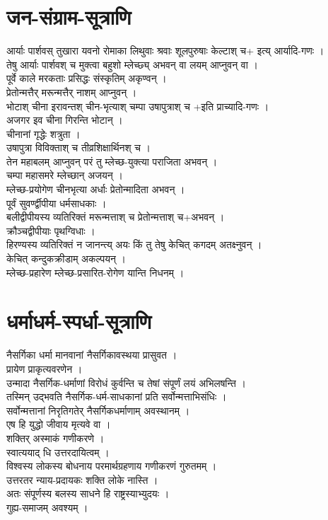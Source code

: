 \documentclass[12pt]{article}
\begin{document}
\section {{\skt जन-संग्राम-सूत्राणि
}}
{\skt आर्याः पार्शवस् तुखारा यवनो रोमाका लिथुवाः श्रवाः शूलपुरुषाः केल्टाश् च+ इत्य् आर्यादि-गणः ।\\
तेषु आर्याः पार्शवश् च मुक्त्वा बहुशो म्लेच्छ्य् अभवन् वा लयम् आप्नुवन् वा ।\\
पूर्वे काले मरकताः प्रसिद्धः संस्कृतिम् अकृण्वन् ।\\
प्रेतोन्मत्तैर् मरून्मत्तैर् नाशम् आप्नुवन् ।\\
भोटाश् चीना इरावन्तश् चीन-भृत्याश् चम्पा उषापुत्राश् च +इति प्राच्यादि-गणः ।\\
अजगर इव चीना गिरन्ति भोटान् ।\\
चीनानां गृद्धेः शत्रुता ।\\
उषापुत्रा विविक्ताश् च तीव्रशिक्षार्थिनश् च ।\\
तेन महाबलम् आप्नुवन् परं तु म्लेच्छ-युक्त्या पराजिता अभवन् ।\\
चम्पा महासमरे म्लेच्छान् अजयन् ।\\
म्लेच्छ-प्रयोगेण चीनभृत्या अर्धाः प्रेतोन्मादिता अभवन् ।\\
पूर्वं सुवर्ण्द्वीपीया धर्मसाधकाः ।\\
बलीद्वीपीयस्य व्यतिरिक्तं मरून्मत्ताश् च प्रेतोन्मत्ताश् च+अभवन् ।\\
क्रौञ्चद्वीपीयाः पृथग्विधाः ।\\
हिरण्यस्य व्यतिरिक्तं न जानन्त्य् अयः किं तु तेषु केचित् कगदम् अतक्ष्नुवन् ।\\
केचित् कन्दुकक्रीडाम् अकल्पयन् ।\\
म्लेच्छ-प्रहारेण म्लेच्छ-प्रसारित-रोगेण यान्ति निधनम् ।\\
}
\section{{\skt धर्माधर्म-स्पर्धा-सूत्राणि
}}
{ \skt नैसर्गिका धर्मा मानवानां नैसर्गिकावस्थया प्रासुवत ।\\
प्रायेण प्राकृत्यवरणेन ।\\
उन्मादा नैसर्गिक-धर्माणां विरोधं कुर्वन्ति च तेषां संपूर्णं लयं अभिलषन्ति ।\\
तस्मिन् उद्भवति नैसर्गिक-धर्म-साधकानां प्रति सर्वोन्मत्ताभिसंधिः ।\\
सर्वोन्मत्तानां निरृतिगतेर् नैसर्गिकधर्माणाम् अवस्थानम् ।\\
एष हि युद्धो जीवाय मृत्यवे वा ।\\
शक्तिर् अस्माकं गणीकरणे ।\\
स्वात्ययाद् धि उत्तरदायित्वम् ।\\
विश्वस्य लोकस्य बोधनाय परमार्थग्रहणाय गणीकरणं गुरुतमम् ।\\
उत्तरतर न्याय-प्रदायकः शक्ति लोके नास्ति । \\
अतः संपूर्णस्य बलस्य साधने हि राष्ट्रस्याभ्युदयः ।\\
गुह्य-समाजम् अवश्यम् ।\\
}
\end{document}
